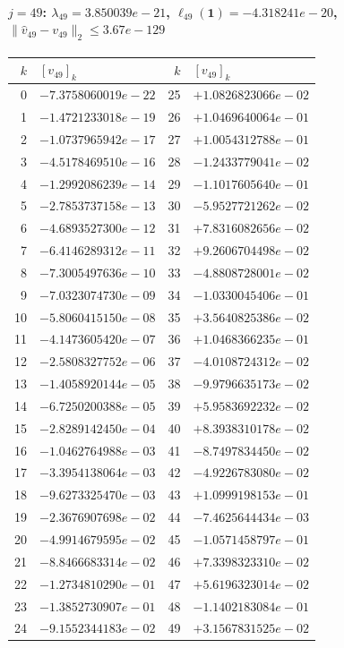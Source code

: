 \documentclass[11pt]{article}
\begin{document}
\paragraph{$j = 49$: $\lambda_{49} = 3.850039e-21$, \quad $\ell_{49}(\mathbf{1}) = -4.318241e-20$, \quad $\|\hat{v}_{49} - v_{49}\|_2 \leq 3.67e-129$}
\begin{center}
{\footnotesize
\begin{tabular}{r@{\;\;}l@{\quad}r@{\;\;}l}
\toprule
$k$ & $[v_{49}]_k$ & $k$ & $[v_{49}]_k$ \\
\midrule
0 & $-7.3758060019e-22$ & 25 & $+1.0826823066e-02$ \\
1 & $-1.4721233018e-19$ & 26 & $+1.0469640064e-01$ \\
2 & $-1.0737965942e-17$ & 27 & $+1.0054312788e-01$ \\
3 & $-4.5178469510e-16$ & 28 & $-1.2433779041e-02$ \\
4 & $-1.2992086239e-14$ & 29 & $-1.1017605640e-01$ \\
5 & $-2.7853737158e-13$ & 30 & $-5.9527721262e-02$ \\
6 & $-4.6893527300e-12$ & 31 & $+7.8316082656e-02$ \\
7 & $-6.4146289312e-11$ & 32 & $+9.2606704498e-02$ \\
8 & $-7.3005497636e-10$ & 33 & $-4.8808728001e-02$ \\
9 & $-7.0323074730e-09$ & 34 & $-1.0330045406e-01$ \\
10 & $-5.8060415150e-08$ & 35 & $+3.5640825386e-02$ \\
11 & $-4.1473605420e-07$ & 36 & $+1.0468366235e-01$ \\
12 & $-2.5808327752e-06$ & 37 & $-4.0108724312e-02$ \\
13 & $-1.4058920144e-05$ & 38 & $-9.9796635173e-02$ \\
14 & $-6.7250200388e-05$ & 39 & $+5.9583692232e-02$ \\
15 & $-2.8289142450e-04$ & 40 & $+8.3938310178e-02$ \\
16 & $-1.0462764988e-03$ & 41 & $-8.7497834450e-02$ \\
17 & $-3.3954138064e-03$ & 42 & $-4.9226783080e-02$ \\
18 & $-9.6273325470e-03$ & 43 & $+1.0999198153e-01$ \\
19 & $-2.3676907698e-02$ & 44 & $-7.4625644434e-03$ \\
20 & $-4.9914679595e-02$ & 45 & $-1.0571458797e-01$ \\
21 & $-8.8466683314e-02$ & 46 & $+7.3398323310e-02$ \\
22 & $-1.2734810290e-01$ & 47 & $+5.6196323014e-02$ \\
23 & $-1.3852730907e-01$ & 48 & $-1.1402183084e-01$ \\
24 & $-9.1552344183e-02$ & 49 & $+3.1567831525e-02$ \\
\bottomrule
\end{tabular}
}
\end{center}
\end{document}

